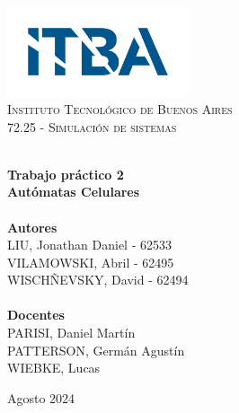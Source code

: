 
\begin{titlepage}
    \vbox{ }
    \vbox{ }
    \begin{center}
        \includegraphics[width=0.40\textwidth]{Images/ITBA logo.png}\\[1cm]
        \textsc{\LARGE Instituto Tecnológico de Buenos Aires}\\[1.5cm]
        \textsc{\Large 72.25 - Simulación de sistemas}\\[0.5cm]
        \vbox{ }

        \HRule \\[0.4cm]
        { \huge \bfseries Trabajo práctico 2\\[0.3cm]Autómatas Celulares}\\[0.4cm]
        \HRule \\[1.5cm]

        \large
        \textbf{Autores}\\[0.4cm]
        LIU, Jonathan Daniel - 62533\\[0.2cm]
        VILAMOWSKI, Abril - 62495\\[0.2cm]
        WISCHÑEVSKY, David - 62494\\[0.2cm]
        \\[1.5cm]

        \large
        \textbf{Docentes}\\[0.4cm]
        PARISI, Daniel Martín \\[0.2cm]
        PATTERSON, Germán Agustín \\[0.2cm]
        WIEBKE, Lucas \\[0.2cm]

        \vfill

        {\large Agosto 2024}
    \end{center}
\end{titlepage}